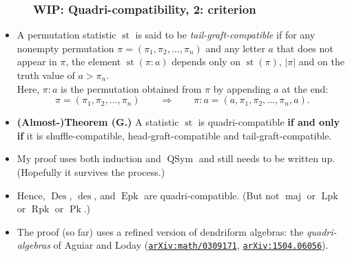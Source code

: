 \documentclass{beamer}
\newcommand{\red}{\color{red}}
\newcommand{\Lpk}{\operatorname{Lpk}}
\newcommand{\Rpk}{\operatorname{Rpk}}
\newcommand{\Pk}{\operatorname{Pk}}
\newcommand{\Epk}{\operatorname{Epk}}
\newcommand{\Des}{\operatorname{Des}}
\newcommand{\des}{\operatorname{des}}
\newcommand{\maj}{\operatorname{maj}}
\newcommand{\st}{\operatorname{st}}
\newcommand{\QSym}{\operatorname{QSym}}
\newcommand\arxiv[1]{\href{http://www.arxiv.org/abs/#1}{\texttt{arXiv:#1}}}
\newcommand{\fti}[1]{\frametitle{\ \ \ \ \ #1}}
\newcommand{\tup}[1]{\left( #1 \right)}
\newcommand{\defn}[1]{{\color{darkred}\emph{#1}}} %
\theoremstyle{plain}
\begin{document}
\begin{frame}
\fti{WIP: Quadri-compatibility, 2: criterion}

\begin{itemize}

\item A permutation statistic $\st$ is said to be
      \defn{tail-graft-compatible} if for any nonempty permutation
      $\pi = \tup{\pi_1, \pi_2, \ldots, \pi_n}$ and any
      letter $a$ that does not appear in $\pi$, the element
      $\operatorname*{st} \left( \pi : a \right)  $
      depends only on $\operatorname*{st}\left(  \pi\right)$,
      $\left\vert \pi\right\vert $ and on the truth value of $a > \pi_n$. \\
      Here,
      $\pi : a$ is the permutation obtained from $\pi$ by appending $a$ at the end:
      \[
      \pi = \tup{\pi_1, \pi_2, \ldots, \pi_n} \qquad \Longrightarrow \qquad
      \pi : a = \tup{a, \pi_1, \pi_2, \ldots, \pi_n, a} .
      \]
      
\pause
\item \textbf{(Almost-)Theorem (G.)}
      A statistic $\st$ is quadri-compatible \textbf{if and only if}
      it is shuffle-compatible, head-graft-compatible
      and tail-graft-compatible.

\item My proof uses both induction and $\QSym$ and still needs to be
      written up. (Hopefully it survives the process.)

\pause
\item Hence, $\Des$, $\des$, and $\Epk$ are
      quadri-compatible. \pause
      (But not $\maj$ or $\Lpk$ or $\Rpk$ or $\Pk$.)
\pause

\item The proof (so far) uses a refined version of dendriform algebras:
      the \emph{quadri-algebras} of Aguiar and Loday
      ({\red \arxiv{math/0309171}}, {\red \arxiv{1504.06056}}).

\end{itemize}
\vspace{10cm}

\end{frame}





      
\end{document}
